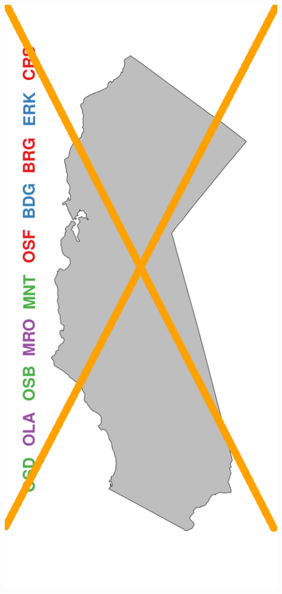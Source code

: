 \documentclass[a0paper,portrait]{baposter}
\begin{document}
\begin{poster}
{\begin{minipage}[h!]{0.19\textwidth}
	        \includegraphics[width=0.91\textwidth]{../pictures/mapLeapFrogNotOrange.pdf}
	\end{minipage}
	\begin{minipage}[h!]{0.19\textwidth}
	        \hspace*{0.25cm}

\end{minipage}}
\end{poster}
\end{document}
